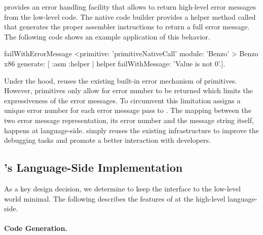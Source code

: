\B provides an error handling facility that allows to return high-level error messages from the low-level code.
The native code builder provides a helper method called  that generates the proper assembler instructions to return a full error message. The following code shows an example application of this behavior.
%
\begin{stcode}[emph={asm}]{5}
failWithErrorMessage
	<primitive: 'primitiveNativeCall' 
	 module: 'Benzo' >
	 Benzo x86 generate: [ :asm :helper |
		helper failWithMessage: 'Value is not 0'.].
\end{stcode}
%
Under the hood, \B reuses the existing built-in error mechanism of \PH primitives.
However, primitives only allow for error number to be returned which limits the expressiveness of the error messages.
To circumvent this limitation \B assigns a unique error number for each error message pass to .
The mapping between the two error message representation, its error number and the message string itself, happens at language-side.
\B simply reuses the existing infrastructure to improve the debugging tasks and promote a better interaction with developers.

\subsection{\B's Language-Side Implementation}
As a key design decision, we determine to keep the interface to the low-level world minimal.
The following describes the features of \B at the high-level language-side.

\paragraph{Code Generation.}

